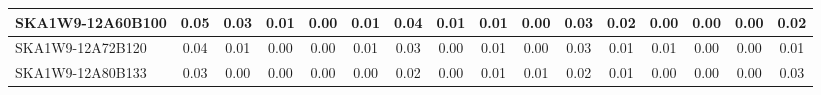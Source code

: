 \begin{table}[H]
{{\begin{tabular}{|lccccc||ccccc||ccccc|}
SKA1W9-12A60B100 & 0.05 \cellcolor{blue!60.00} & 0.03 \cellcolor{red!60.00} & 0.01 \cellcolor{green!60.00} & 0.00 \cellcolor{orange!18.00} & 0.01 \cellcolor{purple!60.00} & 0.04 \cellcolor{blue!60.00} & 0.01 \cellcolor{red!39.00} & 0.01 \cellcolor{green!18.00} & 0.00 \cellcolor{orange!18.00} & 0.03 \cellcolor{purple!60.00} & 0.02 \cellcolor{blue!39.00} & 0.00 \cellcolor{red!18.00} & 0.00 \cellcolor{green!18.00} & 0.00 \cellcolor{orange!18.00} & 0.02 \cellcolor{purple!28.50}\\ \hline 
SKA1W9-12A72B120 & 0.04 \cellcolor{blue!39.00} & 0.01 \cellcolor{red!32.00} & 0.00 \cellcolor{green!18.00} & 0.00 \cellcolor{orange!18.00} & 0.01 \cellcolor{purple!60.00} & 0.03 \cellcolor{blue!39.00} & 0.00 \cellcolor{red!18.00} & 0.01 \cellcolor{green!18.00} & 0.00 \cellcolor{orange!18.00} & 0.03 \cellcolor{purple!60.00} & 0.01 \cellcolor{blue!18.00} & 0.01 \cellcolor{red!60.00} & 0.00 \cellcolor{green!18.00} & 0.00 \cellcolor{orange!18.00} & 0.01 \cellcolor{purple!18.00}\\ \hline 
SKA1W9-12A80B133 & 0.03 \cellcolor{blue!18.00} & 0.00 \cellcolor{red!18.00} & 0.00 \cellcolor{green!18.00} & 0.00 \cellcolor{orange!18.00} & 0.00 \cellcolor{purple!18.00} & 0.02 \cellcolor{blue!18.00} & 0.00 \cellcolor{red!18.00} & 0.01 \cellcolor{green!18.00} & 0.01 \cellcolor{orange!60.00} & 0.02 \cellcolor{purple!18.00} & 0.01 \cellcolor{blue!18.00} & 0.00 \cellcolor{red!18.00} & 0.00 \cellcolor{green!18.00} & 0.00 \cellcolor{orange!18.00} & 0.03 \cellcolor{purple!39.00}\\ \hline 
\end{tabular}}
\vspace{-0.300000cm}
\hspace{1cm} 
}
\end{table}
